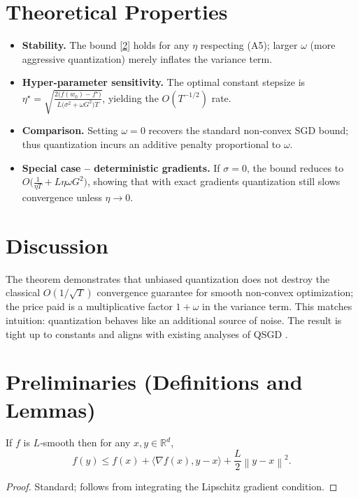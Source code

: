 \documentclass{article}
\newcommand{\R}{\mathbb{R}}
\newcommand{\norm}[1]{\left\lVert #1\right\rVert}
\newcommand{\ip}[2]{\langle #1,#2\rangle}
\newcommand{\grad}{\nabla}
\begin{document}
\section*{Theoretical Properties}
\begin{itemize}
\item \textbf{Stability.} The bound \eqref{2} holds for any $\eta$ respecting (A5); larger $\omega$ (more aggressive quantization) merely inflates the variance term.
\item \textbf{Hyper‑parameter sensitivity.} The optimal constant stepsize is $\eta^{\star}= \sqrt{\frac{2\big(f(w_0)-f^{\star}\big)}{L\big(\sigma^2+\omega G^2\big)T}}$, yielding the $O(T^{-1/2})$ rate.
\item \textbf{Comparison.} Setting $\omega=0$ recovers the standard non‑convex SGD bound; thus quantization incurs an additive penalty proportional to $\omega$.
\item \textbf{Special case – deterministic gradients.} If $\sigma=0$, the bound reduces to $O\big(\frac{1}{\eta T}+L\eta\omega G^2\big)$, showing that with exact gradients quantization still slows convergence unless $\eta\to0$.
\end{itemize}

\section*{Discussion}
The theorem demonstrates that unbiased quantization does not destroy the classical $O(1/\sqrt{T})$ convergence guarantee for smooth non‑convex optimization; the price paid is a multiplicative factor $1+\omega$ in the variance term. This matches intuition: quantization behaves like an additional source of noise. The result is tight up to constants and aligns with existing analyses of QSGD \cite{Alistarh2017}.

\newpage
\section*{Preliminaries (Definitions and Lemmas)}
\begin{lemma}\label{lem:smooth}
If $f$ is $L$‑smooth then for any $x,y\in\R^d$,
\[
f(y)\le f(x)+\ip{\grad f(x)}{y-x}+\frac{L}{2}\norm{y-x}^2 .
\]
\end{lemma}
\begin{proof}
Standard; follows from integrating the Lipschitz gradient condition. \qedhere
\end{proof}
\end{document}
